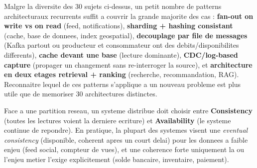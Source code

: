 \documentclass[11pt,a4paper]{article}
\begin{document}
\begin{cle}
Malgre la diversite des 30 sujets ci-dessus, un petit nombre de patterns architecturaux recurrents suffit a couvrir la grande majorite des cas : \textbf{fan-out on write vs on read} (feed, notifications), \textbf{sharding + hashing consistant} (cache, base de donnees, index geospatial), \textbf{decouplage par file de messages} (Kafka partout ou producteur et consommateur ont des debits/disponibilites differents), \textbf{cache devant une base} (lecture dominante), \textbf{CDC/log-based capture} (propager un changement sans re-interroger la source), et \textbf{architecture en deux etages retrieval + ranking} (recherche, recommandation, RAG). Reconnaitre lequel de ces patterns s'applique a un nouveau probleme est plus utile que de memoriser 30 architectures distinctes.
\end{cle}

\begin{tradeoff}
Face a une partition reseau, un systeme distribue doit choisir entre \textbf{Consistency} (toutes les lectures voient la derniere ecriture) et \textbf{Availability} (le systeme continue de repondre). En pratique, la plupart des systemes visent une \emph{eventual consistency} (disponible, coherent apres un court delai) pour les donnees a faible enjeu (feed social, compteur de vues), et une coherence forte uniquement la ou l'enjeu metier l'exige explicitement (solde bancaire, inventaire, paiement).
\end{tradeoff}
\end{document}
